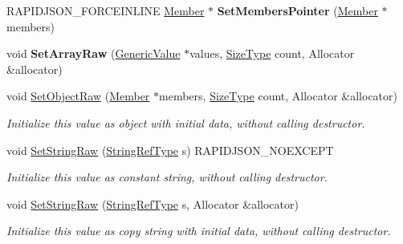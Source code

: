 \begin{DoxyCompactItemize}
R\+A\+P\+I\+D\+J\+S\+O\+N\+\_\+\+F\+O\+R\+C\+E\+I\+N\+L\+I\+NE \hyperlink{a01992_a7ccf27c44058b4c11c3efc6473afb886}{Member} $\ast$ {\bfseries Set\+Members\+Pointer} (\hyperlink{a01992_a7ccf27c44058b4c11c3efc6473afb886}{Member} $\ast$members)
\item 
\mbox{\label{a01992_a8f5f309065479de40a16cf28a340da65}} 
void {\bfseries Set\+Array\+Raw} (\hyperlink{a01992}{Generic\+Value} $\ast$values, \hyperlink{a00560_a5ed6e6e67250fadbd041127e6386dcb5}{Size\+Type} count, Allocator \&allocator)
\item 
\mbox{\label{a01992_a26c8ec7d68858df1038506df7fcff22d}} 
void \hyperlink{a01992_a26c8ec7d68858df1038506df7fcff22d}{Set\+Object\+Raw} (\hyperlink{a01992_a7ccf27c44058b4c11c3efc6473afb886}{Member} $\ast$members, \hyperlink{a00560_a5ed6e6e67250fadbd041127e6386dcb5}{Size\+Type} count, Allocator \&allocator)
\begin{DoxyCompactList}\small\item\em Initialize this value as object with initial data, without calling destructor. \end{DoxyCompactList}\item 
\mbox{\label{a01992_a1451603922dcdf34976f125dc60f70ee}} 
void \hyperlink{a01992_a1451603922dcdf34976f125dc60f70ee}{Set\+String\+Raw} (\hyperlink{a01992_a32e0f30ee278072374c8168b14d3317f}{String\+Ref\+Type} s) R\+A\+P\+I\+D\+J\+S\+O\+N\+\_\+\+N\+O\+E\+X\+C\+E\+PT
\begin{DoxyCompactList}\small\item\em Initialize this value as constant string, without calling destructor. \end{DoxyCompactList}\item 
\mbox{\label{a01992_ad3d91db36dfdbfc1af40a79aae07723c}} 
void \hyperlink{a01992_ad3d91db36dfdbfc1af40a79aae07723c}{Set\+String\+Raw} (\hyperlink{a01992_a32e0f30ee278072374c8168b14d3317f}{String\+Ref\+Type} s, Allocator \&allocator)
\begin{DoxyCompactList}\small\item\em Initialize this value as copy string with initial data, without calling destructor. \end{DoxyCompactList}\item 
\mbox{\label{a01992_abb8ea2dfbe74ff4ee7dac6be31317f81}} 

\end{DoxyCompactItemize}
